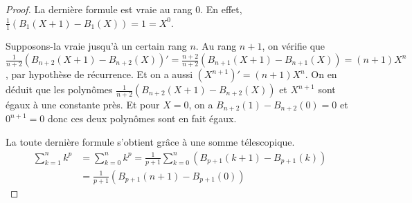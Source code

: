\begin{proof}
%
%

La dernière formule est vraie au rang $0$. En effet, $\frac{1}{1}(B_1(X+1) - B_1(X)) = 1 = X^0$.

\medskip
Supposons-la vraie jusqu'à un certain rang $n$. Au rang $n+1$, on vérifie que $\frac{1}{n+2}(B_{n+2}(X+1) - B_{n+2}(X))' = \frac{n+2}{n+2} \left (B_{n+1}(X+1) - B_{n+1}(X)\right ) = (n+1) X^n$, par hypothèse de récurrence. Et on a aussi $(X^{n+1})' = (n+1)X^n$. On en déduit que les polynômes $\frac{1}{n+2} \left (B_{n+2}(X+1) - B_{n+2}(X)\right )$ et $X^{n+1}$ sont égaux à une constante près. Et pour $X=0$, on a $B_{n+2}(1) - B_{n+2}(0) = 0$ et $0^{n+1} = 0$ donc ces deux polynômes sont en fait égaux.

\medskip
La toute dernière formule s'obtient grâce à une somme télescopique.
\begin{align*}
\displaystyle{\sum_{k=1}^n} k^p & = \displaystyle{\sum_{k=0}^n} k^p = \frac{1}{p+1}\displaystyle{\sum_{k=0}^n} \left (B_{p+1}(k+1) - B_{p+1}(k)\right ) \\
 & = \frac{1}{p+1} \left ( B_{p+1}(n+1) - B_{p+1}(0) \right )
\end{align*}

\end{proof}


